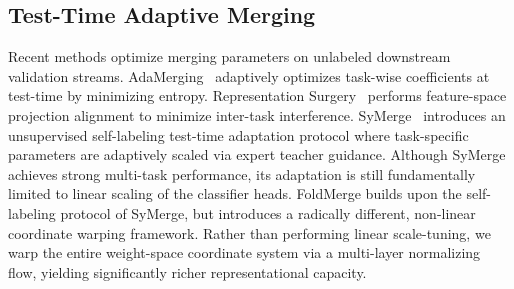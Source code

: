 \subsection{Test-Time Adaptive Merging}
Recent methods optimize merging parameters on unlabeled downstream validation streams. 
AdaMerging~\cite{yang2024adamerging} adaptively optimizes task-wise coefficients at test-time by minimizing entropy. 
Representation Surgery~\cite{gu2024patch} performs feature-space projection alignment to minimize inter-task interference. 
SyMerge~\cite{jung2025symerge} introduces an unsupervised self-labeling test-time adaptation protocol where task-specific parameters are adaptively scaled via expert teacher guidance. 
Although SyMerge achieves strong multi-task performance, its adaptation is still fundamentally limited to linear scaling of the classifier heads. 
FoldMerge builds upon the self-labeling protocol of SyMerge, but introduces a radically different, non-linear coordinate warping framework. 
Rather than performing linear scale-tuning, we warp the entire weight-space coordinate system via a multi-layer normalizing flow, yielding significantly richer representational capacity.
